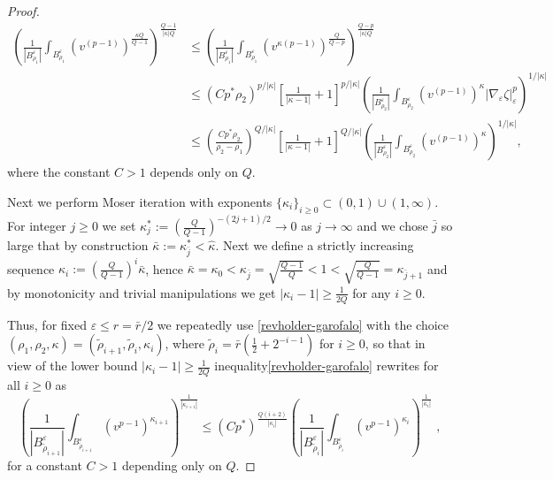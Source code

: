 \documentclass[10pt]{amsart}
\numberwithin{equation}{section}
\theoremstyle{definition}
\begin{document}
\begin{proof}
  \begin{equation}
  \label{revholder-garofalo}
  \begin{aligned}	
  \left( \frac{1}{|B^\varepsilon_{\rho_1}|}   \int_{B^\varepsilon_{ \rho_1}}    \left( v^{(p-1)}\right)^{\frac{\kappa Q}{Q-1}} \right)^{\frac{Q-1}{|\kappa| Q}}   &\leq \left( \frac{1}{|B^\varepsilon_{\rho_1}|}   \int_{B^\varepsilon_{ \rho_1}}    \left( v^{\kappa(p-1)}\right)^{\frac{Q}{Q-p}} \right)^{\frac{Q-p}{|\kappa| Q}} \\
 & \leq \left(
 C p^* \rho_2\right)^{p/|\kappa|} \left[   \frac{1}{|\kappa -1|}+1\right]^{p/|\kappa|}  \left( \frac{1}{|B^\varepsilon_{\rho_2}|}\int_{B^\varepsilon_{\rho_2}}   \left( v^{(p-1) }\right)^\kappa   |\nabla_\varepsilon \zeta|_\varepsilon^p \right)^{1/|\kappa|}
    \\
  & \leq  \left(
 \frac{C p^* \rho_2}{\rho_2-\rho_1}\right)^{Q/|\kappa|} \left[   \frac{1}{|\kappa -1|}+1\right]^{Q/|\kappa|}  \left( \frac{1}{|B^\varepsilon_{\rho_2}|}\int_{B^\varepsilon_{\rho_2}}   \left( v^{(p-1) }\right)^\kappa   \right)^{1/|\kappa|},
 \end{aligned}
\end{equation}
where the constant $C>1$ depends only on $Q$. 



Next we perform Moser iteration with exponents $\{ \kappa_i\}_{i \geq 0} \subset (0,1) \cup (1, \infty)$. For integer $j \geq 0$ we set $\kappa_j^*:=\left( \frac{Q}{Q-1}\right)^{-(2j+1)/2} \to 0$ as $j \to \infty$ and we chose $\bar{j}$ so large that by construction $\bar{\kappa}:=\kappa^*_{\bar{j}} <\hat{\kappa}$. Next we define a strictly increasing sequence $\kappa_i:= \left(\frac{Q}{Q-1}\right)^i \bar{\kappa}$, hence $\bar{\kappa}=\kappa_0<\kappa_{\bar{j}}=\sqrt{\frac{Q-1}{Q}}<1< \sqrt{\frac{Q}{Q-1}}=\kappa_{\bar{j}+1}$ and by monotonicity and trivial manipulations we get $|\kappa_i-1| \geq \frac{1}{2Q}$ for any $i \geq 0$.

Thus, for fixed $\varepsilon \leq r = \bar{r}/2$ we repeatedly use \eqref{revholder-garofalo} with the choice $(\rho_1,\rho_2,\kappa)=(\tilde{\rho}_{i+1}, \tilde{\rho}_i,\kappa_i)$, where $\tilde{\rho}_i=\bar{r}(\frac12+2^{-i-1})$ for $i \geq 0$, so that in view of the lower bound $|\kappa_i-1| \geq \frac{1}{2Q}$ inequality\eqref{revholder-garofalo} rewrites for all $i\geq 0$ as
\begin{equation}
\label{revholder-g1}
\left( \frac{1}{|B^\varepsilon_{\tilde{\rho}_{i+1}}|}\int_{B^\varepsilon_{\tilde{\rho}_{i+1}}}   \left(v^{p-1} \right)^{\kappa_{i+1}} \right)^{\frac{1}{|\kappa_{i+1}|}} \leq (C p^*)^{\frac{Q(i+2)}{|\kappa_i|}} \left( \frac{1}{|B^\varepsilon_{\tilde{\rho}_i}|}\int_{ B_{ \tilde{\rho}_i}^\varepsilon} \left(v^{p-1} \right)^{\kappa_i}  \right)^{\frac{1}{|\kappa_i|}}\, 
\, ,
\end{equation}
for a constant $C>1$ depending only on $Q$.




\end{proof}
\end{document}
